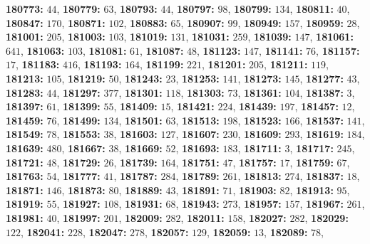 \textsf{\bfseries 180773:} $44$, \textsf{\bfseries 180779:} $63$, \textsf{\bfseries 180793:} $44$, \textsf{\bfseries 180797:} $98$, \textsf{\bfseries 180799:} $134$, \textsf{\bfseries 180811:} $40$, \textsf{\bfseries 180847:} $170$, \textsf{\bfseries 180871:} $102$, \textsf{\bfseries 180883:} $65$, \textsf{\bfseries 180907:} $99$, \textsf{\bfseries 180949:} $157$, \textsf{\bfseries 180959:} $28$, \textsf{\bfseries 181001:} $205$, \textsf{\bfseries 181003:} $103$, \textsf{\bfseries 181019:} $131$, \textsf{\bfseries 181031:} $259$, \textsf{\bfseries 181039:} $147$, \textsf{\bfseries 181061:} $641$, \textsf{\bfseries 181063:} $103$, \textsf{\bfseries 181081:} $61$, \textsf{\bfseries 181087:} $48$, \textsf{\bfseries 181123:} $147$, \textsf{\bfseries 181141:} $76$, \textsf{\bfseries 181157:} $17$, \textsf{\bfseries 181183:} $416$, \textsf{\bfseries 181193:} $164$, \textsf{\bfseries 181199:} $221$, \textsf{\bfseries 181201:} $205$, \textsf{\bfseries 181211:} $119$, \textsf{\bfseries 181213:} $105$, \textsf{\bfseries 181219:} $50$, \textsf{\bfseries 181243:} $23$, \textsf{\bfseries 181253:} $141$, \textsf{\bfseries 181273:} $145$, \textsf{\bfseries 181277:} $43$, \textsf{\bfseries 181283:} $44$, \textsf{\bfseries 181297:} $377$, \textsf{\bfseries 181301:} $118$, \textsf{\bfseries 181303:} $73$, \textsf{\bfseries 181361:} $104$, \textsf{\bfseries 181387:} $3$, \textsf{\bfseries 181397:} $61$, \textsf{\bfseries 181399:} $55$, \textsf{\bfseries 181409:} $15$, \textsf{\bfseries 181421:} $224$, \textsf{\bfseries 181439:} $197$, \textsf{\bfseries 181457:} $12$, \textsf{\bfseries 181459:} $76$, \textsf{\bfseries 181499:} $134$, \textsf{\bfseries 181501:} $63$, \textsf{\bfseries 181513:} $198$, \textsf{\bfseries 181523:} $166$, \textsf{\bfseries 181537:} $141$, \textsf{\bfseries 181549:} $78$, \textsf{\bfseries 181553:} $38$, \textsf{\bfseries 181603:} $127$, \textsf{\bfseries 181607:} $230$, \textsf{\bfseries 181609:} $293$, \textsf{\bfseries 181619:} $184$, \textsf{\bfseries 181639:} $480$, \textsf{\bfseries 181667:} $38$, \textsf{\bfseries 181669:} $52$, \textsf{\bfseries 181693:} $183$, \textsf{\bfseries 181711:} $3$, \textsf{\bfseries 181717:} $245$, \textsf{\bfseries 181721:} $48$, \textsf{\bfseries 181729:} $26$, \textsf{\bfseries 181739:} $164$, \textsf{\bfseries 181751:} $47$, \textsf{\bfseries 181757:} $17$, \textsf{\bfseries 181759:} $67$, \textsf{\bfseries 181763:} $54$, \textsf{\bfseries 181777:} $41$, \textsf{\bfseries 181787:} $284$, \textsf{\bfseries 181789:} $261$, \textsf{\bfseries 181813:} $274$, \textsf{\bfseries 181837:} $18$, \textsf{\bfseries 181871:} $146$, \textsf{\bfseries 181873:} $80$, \textsf{\bfseries 181889:} $43$, \textsf{\bfseries 181891:} $71$, \textsf{\bfseries 181903:} $82$, \textsf{\bfseries 181913:} $95$, \textsf{\bfseries 181919:} $55$, \textsf{\bfseries 181927:} $108$, \textsf{\bfseries 181931:} $68$, \textsf{\bfseries 181943:} $273$, \textsf{\bfseries 181957:} $157$, \textsf{\bfseries 181967:} $261$, \textsf{\bfseries 181981:} $40$, \textsf{\bfseries 181997:} $201$, \textsf{\bfseries 182009:} $282$, \textsf{\bfseries 182011:} $158$, \textsf{\bfseries 182027:} $282$, \textsf{\bfseries 182029:} $122$, \textsf{\bfseries 182041:} $228$, \textsf{\bfseries 182047:} $278$, \textsf{\bfseries 182057:} $129$, \textsf{\bfseries 182059:} $13$, \textsf{\bfseries 182089:} $78$, 
